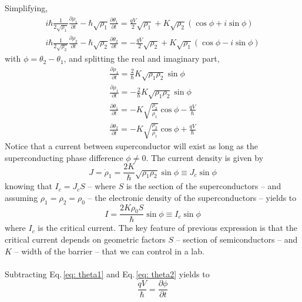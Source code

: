 Simplifying, 
\begin{align}
i\hbar \frac{1}{2\sqrt{\rho_{1}}}\frac{\partial \rho_{1}}{\partial t} - \hbar\sqrt{\rho_{1}}\frac{\partial\theta_{1}}{\partial t} = \frac{qV}{2}\sqrt{\rho_{1}} + K\sqrt{\rho_{2}}\left(\cos{\phi} + i\sin{\phi}\right) \\
i\hbar \frac{1}{2\sqrt{\rho_{2}}}\frac{\partial \rho_{2}}{\partial t} - \hbar\sqrt{\rho_{2}}\frac{\partial\theta_{2}}{\partial t} = -\frac{qV}{2}\sqrt{\rho_{2}} + K\sqrt{\rho_{1}}\left(\cos{\phi} - i\sin{\phi}\right)
\end{align}
with $\phi = \theta_{2} - \theta_{1}$, and splitting the real and imaginary part,
\begin{align}
\frac{\partial \rho_{1}}{\partial t} = \frac{2}{\hbar}K\sqrt{\rho_{1}\rho_{2}}\sin{\phi} \\
\frac{\partial \rho_{1}}{\partial t} = -\frac{2}{\hbar}K\sqrt{\rho_{1}\rho_{2}}\sin{\phi} \\
\label{eq: theta1}
\frac{\partial \theta_{1}}{\partial t} = - K\sqrt{\frac{\rho_{2}}{\rho_{1}}}\cos{\phi}-\frac{qV}{\hbar} \\
\label{eq: theta2}
\frac{\partial \theta_{2}}{\partial t} = - K\sqrt{\frac{\rho_{2}}{\rho_{1}}}\cos{\phi}+\frac{qV}{\hbar}
\end{align}
Notice that a current between superconductor will exist as long as the superconducting phase difference $\phi \neq 0$.
The current density is given by
\begin{equation}
J = \dot{\rho}_{1} = \frac{2K}{\hbar}\sqrt{\rho_{1}\rho_{2}}\sin{\phi} \equiv J_{c}\sin{\phi}
\end{equation}
knowing that $I_{c} = J_{c}S$ -- where $S$ is the section of the superconductors -- and assuming $\rho_{1} = \rho_{2} =\rho_{0}$ -- the electronic density of the superconductors -- yields to
\begin{equation}
\tag{First Joshepshon equation}
I =\frac{2K\rho_{0}S}{\hbar}\sin{\phi} \equiv I_{c}\sin{\phi}
\end{equation}
where $I_{c}$ is the critical current.
The key feature of previous expression is that the critical current depends on geometric factors $S$ -- section of semiconductors -- and $K$ -- width of the barrier -- that we can control in a lab.\\\\
Subtracting Eq.\,\eqref{eq: theta1} and Eq.\,\eqref{eq: theta2} yields to
\begin{equation}
\frac{qV}{\hbar} = \frac{\partial\phi}{\partial t}
\end{equation}
